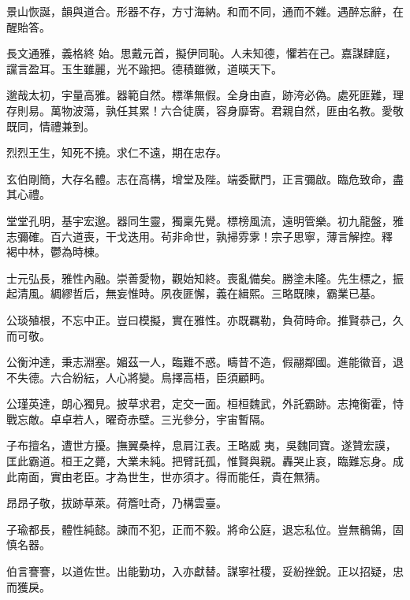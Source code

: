 \begin{pinyinscope}
 景山恢誕，韻與道合。形器不存，方寸海納。和而不同，通而不雜。遇醉忘辭，在醒貽答。



 長文通雅，義格終
 始。思戴元首，擬伊同恥。人未知德，懼若在己。嘉謀肆庭，讜言盈耳。玉生雖麗，光不踰把。德積雖微，道暎天下。



 邈哉太初，宇量高雅。器範自然。標準無假。全身由直，跡洿必偽。處死匪難，理存則易。萬物波蕩，孰任其累！六合徒廣，容身靡寄。君親自然，匪由名教。愛敬既同，情禮兼到。



 烈烈王生，知死不撓。求仁不遠，期在忠存。



 玄伯剛簡，大存名體。志在高構，增堂及陛。端委獸門，正言彌啟。臨危致命，盡其心禮。



 堂堂孔明，基宇宏邈。器同生靈，獨稟先覺。標榜風流，遠明管樂。初九龍盤，雅志彌確。百六道喪，干戈迭用。茍非命世，孰掃雰雺！宗子思寧，薄言解控。釋
 褐中林，鬱為時棟。



 士元弘長，雅性內融。崇善愛物，觀始知終。喪亂備矣。勝塗未隆。先生標之，振起清風。綢繆哲后，無妄惟時。夙夜匪懈，義在緝熙。三略既陳，霸業已基。



 公琰殖根，不忘中正。豈曰模擬，實在雅性。亦既羈勒，負荷時命。推賢恭己，久而可敬。



 公衡沖達，秉志淵塞。媚茲一人，臨難不惑。疇昔不造，假翮鄰國。進能徽音，退不失德。六合紛紜，人心將變。鳥擇高梧，臣須顧眄。



 公瑾英達，朗心獨見。披草求君，定交一面。桓桓魏武，外託霸跡。志掩衡霍，恃戰忘敵。卓卓若人，曜奇赤壁。三光參分，宇宙暫隔。



 子布擅名，遭世方擾。撫翼桑梓，息肩江表。王略威
 夷，吳魏同寶。遂贊宏謨，匡此霸道。桓王之薨，大業未純。把臂託孤，惟賢與親。轟哭止哀，臨難忘身。成此南面，實由老臣。才為世生，世亦須才。得而能任，貴在無猜。



 昂昂子敬，拔跡草萊。荷簷吐奇，乃構雲臺。



 子瑜都長，體性純懿。諫而不犯，正而不毅。將命公庭，退忘私位。豈無鶺鴒，固慎名器。



 伯言謇謇，以道佐世。出能勤功，入亦獻替。謀寧社稷，妥紛挫銳。正以招疑，忠而獲戾。




\end{pinyinscope}
